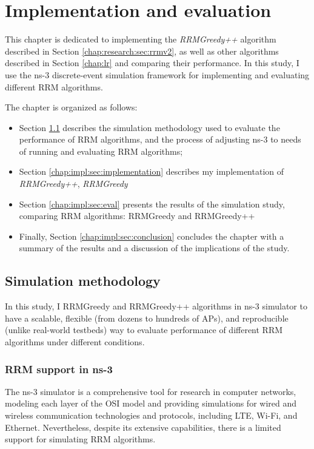 \chapter{Implementation and evaluation}
\label{chap:impl}


This chapter is dedicated to implementing the \textit{RRMGreedy++} algorithm described in Section \ref{chap:research:sec:rrmv2}, as well as other algorithms described in Section \ref{chap:lr} and comparing their performance. In this study, I use the ns-3 discrete-event simulation framework for implementing and evaluating different RRM algorithms.

The chapter is organized as follows:
\begin{itemize}
    \item Section \ref{chap:impl:sec:simulation_method} describes the simulation methodology used to evaluate the performance of RRM algorithms, and the process of adjusting ns-3 to needs of running and evaluating RRM algorithms;
    \item Section \ref{chap:impl:sec:implementation} describes my implementation of \textit{RRMGreedy++}, \textit{RRMGreedy}%
    \item Section \ref{chap:impl:sec:eval} presents the results of the simulation study, comparing RRM algorithms: RRMGreedy and RRMGreedy++%
    \item Finally, Section \ref{chap:impl:sec:conclusion} concludes the chapter with a summary of the results and a discussion of the implications of the study.

\end{itemize}

\section{Simulation methodology}
\label{chap:impl:sec:simulation_method}
In this study, I %
RRMGreedy and RRMGreedy++ algorithms in ns-3 simulator to have a scalable, flexible (from dozens to hundreds of APs), and reproducible (unlike real-world testbeds) way to evaluate performance of different RRM algorithms under different conditions.

\subsection{RRM support in ns-3}
The ns-3 simulator is a comprehensive tool for research in computer networks, modeling each layer of the OSI model and providing simulations for wired and wireless communication technologies and protocols, including LTE, Wi-Fi, and Ethernet. Nevertheless, despite its extensive capabilities, there is a limited support for simulating RRM algorithms.


